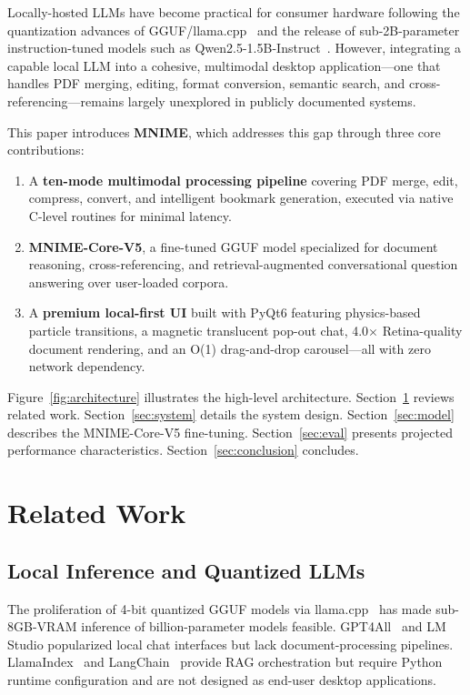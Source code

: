 \documentclass[11pt]{article}
\begin{document}
Locally-hosted LLMs have become practical for consumer hardware following
the quantization advances of GGUF/llama.cpp~\cite{llama_cpp2023} and the
release of sub-2B-parameter instruction-tuned models such as
Qwen2.5-1.5B-Instruct~\cite{qwen2025}.
However, integrating a capable local LLM into a cohesive, multimodal desktop
application---one that handles PDF merging, editing, format conversion,
semantic search, and cross-referencing---remains largely unexplored in
publicly documented systems.

This paper introduces \textbf{MNIME}, which addresses this gap through three
core contributions:
\begin{enumerate}
    \item A \textbf{ten-mode multimodal processing pipeline} covering
    PDF merge, edit, compress, convert, and intelligent bookmark generation,
    executed via native C-level routines for minimal latency.
    \item \textbf{MNIME-Core-V5}, a fine-tuned GGUF model
    specialized for document reasoning, cross-referencing, and
    retrieval-augmented conversational question answering over user-loaded
    corpora.
    \item A \textbf{premium local-first UI} built with PyQt6 featuring
    physics-based particle transitions, a magnetic translucent pop-out chat,
    4.0$\times$ Retina-quality document rendering, and an O(1) drag-and-drop
    carousel---all with zero network dependency.
\end{enumerate}

Figure~\ref{fig:architecture} illustrates the high-level architecture.
Section~\ref{sec:related} reviews related work.
Section~\ref{sec:system} details the system design.
Section~\ref{sec:model} describes the MNIME-Core-V5 fine-tuning.
Section~\ref{sec:eval} presents projected performance characteristics.
Section~\ref{sec:conclusion} concludes.

\section{Related Work}
\label{sec:related}

\subsection{Local Inference and Quantized LLMs}

The proliferation of 4-bit quantized GGUF models via
llama.cpp~\cite{llama_cpp2023} has made sub-8GB-VRAM inference of
billion-parameter models feasible.
GPT4All~\cite{anand2023gpt4all} and LM Studio popularized local chat
interfaces but lack document-processing pipelines.
LlamaIndex~\cite{liu2022llamaindex} and LangChain~\cite{chase2022langchain}
provide RAG orchestration but require Python runtime configuration and are
not designed as end-user desktop applications.
\end{document}
